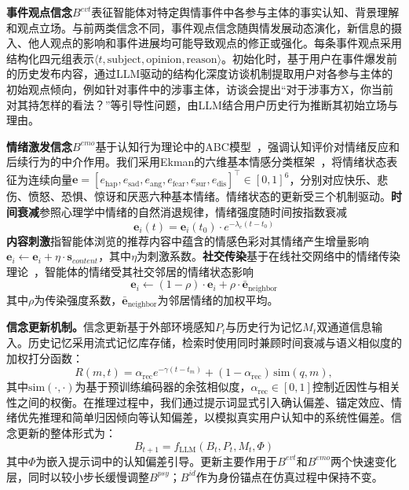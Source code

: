 \documentclass[a4paper,fleqn]{cas-sc}
\begin{document}
\textbf{事件观点信念}$B^{evt}$表征智能体对特定舆情事件中各参与主体的事实认知、背景理解和观点立场。与前两类信念不同，事件观点信念随舆情发展动态演化，新信息的摄入、他人观点的影响和事件进展均可能导致观点的修正或强化。每条事件观点采用结构化四元组表示$\langle t, \text{subject}, \text{opinion}, \text{reason} \rangle$。初始化时，基于用户在事件爆发前的历史发布内容，通过LLM驱动的结构化深度访谈机制提取用户对各参与主体的初始观点倾向，例如针对事件中的涉事主体，访谈会提出“对于涉事方X，你当前对其持怎样的看法？”等引导性问题，由LLM结合用户历史行为推断其初始立场与理由。

\textbf{情绪激发信念}$B^{emo}$基于认知行为理论中的ABC模型~\citep{ellis_reason_1962}，强调认知评价对情绪反应和后续行为的中介作用。我们采用Ekman的六维基本情感分类框架~\citep{ekman_basic_1992}，将情绪状态表征为连续向量$\mathbf{e} = [e_{\text{hap}}, e_{\text{sad}}, e_{\text{ang}}, e_{\text{fear}}, e_{\text{sur}}, e_{\text{dis}}]^\top \in [0,1]^6$，分别对应快乐、悲伤、愤怒、恐惧、惊讶和厌恶六种基本情绪。情绪状态的更新受三个机制驱动。\textbf{时间衰减}参照心理学中情绪的自然消退规律，情绪强度随时间按指数衰减
\begin{equation}
\mathbf{e}_i(t) = \mathbf{e}_i(t_0) \cdot e^{-\lambda_e(t-t_0)}
\end{equation}
\textbf{内容刺激}指智能体浏览的推荐内容中蕴含的情感色彩对其情绪产生增量影响$\mathbf{e}_i \leftarrow \mathbf{e}_i + \eta \cdot \mathbf{s}_{content}$，其中$\eta$为刺激系数。\textbf{社交传染}基于在线社交网络中的情绪传染理论~\citep{hatfield_emotional_1994,kramer_experimental_2014,fan2023emotional_contagion}，智能体的情绪受其社交邻居的情绪状态影响
\begin{equation}
\mathbf{e}_i \leftarrow (1-\rho) \cdot \mathbf{e}_i + \rho \cdot \bar{\mathbf{e}}_{\text{neighbor}}
\end{equation}
其中$\rho$为传染强度系数，$\bar{\mathbf{e}}_{\text{neighbor}}$为邻居情绪的加权平均。

\textbf{信念更新机制。}信念更新基于外部环境感知$P_t$与历史行为记忆$M_t$双通道信息输入。历史记忆采用流式记忆库存储，检索时使用同时兼顾时间衰减与语义相似度的加权打分函数：
\begin{equation}
R(m, t) = \alpha_{\mathrm{rec}} e^{-\gamma(t - t_m)} + (1-\alpha_{\mathrm{rec}})\,\text{sim}(q, m),
\label{eq:mmr}
\end{equation}
其中$\text{sim}(\cdot,\cdot)$为基于预训练编码器的余弦相似度，$\alpha_{\mathrm{rec}}\in[0,1]$控制近因性与相关性之间的权衡。在推理过程中，我们通过提示词显式引入确认偏差、锚定效应、情绪优先推理和简单归因倾向等认知偏差，以模拟真实用户认知中的系统性偏差。信念更新的整体形式为：
\begin{equation}
B_{t+1} = f_{\text{LLM}}(B_t, P_t, M_t, \Phi)
\label{eq:belief_update}
\end{equation}
其中$\Phi$为嵌入提示词中的认知偏差引导。更新主要作用于$B^{evt}$和$B^{emo}$两个快速变化层，同时以较小步长缓慢调整$B^{psy}$；$B^{id}$作为身份锚点在仿真过程中保持不变。
\end{document}
